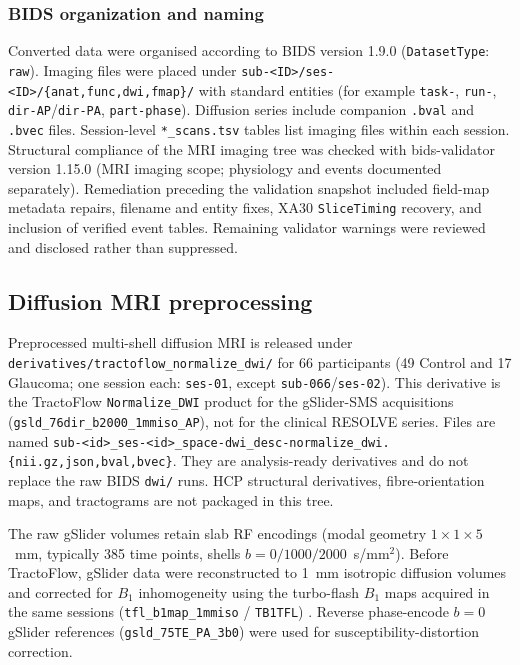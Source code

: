 \subsubsection{BIDS organization and naming}

Converted data were organised according to BIDS version 1.9.0 (\texttt{DatasetType}: \texttt{raw}). Imaging files were placed under \texttt{sub-<ID>/ses-<ID>/\{anat,func,dwi,fmap\}/} with standard entities (for example \texttt{task-}, \texttt{run-}, \texttt{dir-AP}/\texttt{dir-PA}, \texttt{part-phase}). Diffusion series include companion \texttt{.bval} and \texttt{.bvec} files. Session-level \texttt{*_scans.tsv} tables list imaging files within each session. Structural compliance of the MRI imaging tree was checked with bids-validator version 1.15.0 (MRI imaging scope; physiology and events documented separately). Remediation preceding the validation snapshot included field-map metadata repairs, filename and entity fixes, XA30 \texttt{SliceTiming} recovery, and inclusion of verified event tables. Remaining validator warnings were reviewed and disclosed rather than suppressed.

\subsection{Diffusion MRI preprocessing}
\label{sec:dwi_preprocessing}

Preprocessed multi-shell diffusion MRI is released under \texttt{derivatives/tractoflow\_normalize\_dwi/} for 66 participants (49 Control and 17 Glaucoma; one session each: \texttt{ses-01}, except \texttt{sub-066}/\texttt{ses-02}). This derivative is the TractoFlow \texttt{Normalize\_DWI} product for the gSlider-SMS acquisitions (\texttt{gsld\_76dir\_b2000\_1mmiso\_AP}), not for the clinical RESOLVE series. Files are named \texttt{sub-<id>\_ses-<id>\_space-dwi\_desc-normalize\_dwi.\{nii.gz,json,bval,bvec\}}. They are analysis-ready derivatives and do not replace the raw BIDS \texttt{dwi/} runs. HCP structural derivatives, fibre-orientation maps, and tractograms are not packaged in this tree.

The raw gSlider volumes retain slab RF encodings (modal geometry $1 \times 1 \times 5$~mm, typically 385 time points, shells $b=0/1000/2000$~s/mm$^2$). Before TractoFlow, gSlider data were reconstructed to 1~mm isotropic diffusion volumes and corrected for $B_1$ inhomogeneity using the turbo-flash $B_1$ maps acquired in the same sessions (\texttt{tfl\_b1map\_1mmiso} / \texttt{TB1TFL}) \cite{liao2020gslider}. Reverse phase-encode $b=0$ gSlider references (\texttt{gsld\_75TE\_PA\_3b0}) were used for susceptibility-distortion correction.

